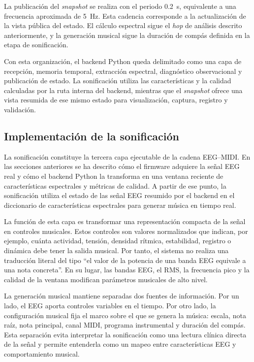 \documentclass[../main.tex]{subfiles}
\begin{document}
La publicación del \textit{snapshot} se realiza con el periodo \SI{0.2}{\second}, equivalente a una frecuencia aproximada de \SI{5}{\hertz}. Esta cadencia corresponde a la actualización de la vista pública del estado. El cálculo espectral sigue el \textit{hop} de análisis descrito anteriormente, y la generación musical sigue la duración de compás definida en la etapa de sonificación.

Con esta organización, el backend Python queda delimitado como una capa de recepción, memoria temporal, extracción espectral, diagnóstico observacional y publicación de estado. La sonificación utiliza las características y la calidad calculadas por la ruta interna del backend, mientras que el \textit{snapshot} ofrece una vista resumida de ese mismo estado para visualización, captura, registro y validación.


\subsection{Implementación de la sonificación}

La sonificación constituye la tercera capa ejecutable de la cadena EEG--MIDI. En las secciones anteriores se ha descrito cómo el firmware adquiere la señal EEG real y cómo el backend Python la transforma en una ventana reciente de características espectrales y métricas de calidad. A partir de ese punto, la sonificación utiliza el estado de las señal EEG resumido por el backend en el diccionario de características espectrales para generar música en tiempo real.

La función de esta capa es transformar una representación compacta de la señal en controles musicales. Estos controles son valores normalizados que indican, por ejemplo, cuánta actividad, tensión, densidad rítmica, estabilidad, registro o dinámica debe tener la salida musical. Por tanto, el sistema no realiza una traducción literal del tipo ``el valor de la potencia de una banda EEG equivale a una nota concreta''. En su lugar, las bandas EEG, el RMS, la frecuencia pico y la calidad de la ventana modifican parámetros musicales de alto nivel.

La generación musical mantiene separadas dos fuentes de información. Por un lado, el EEG aporta controles variables en el tiempo. Por otro lado, la configuración musical fija el marco sobre el que se genera la música: escala, nota raíz, nota principal, canal MIDI, programa instrumental y duración del compás. Esta separación evita interpretar la sonificación como una lectura clínica directa de la señal y permite entenderla como un mapeo entre características EEG y comportamiento musical.
\end{document}
